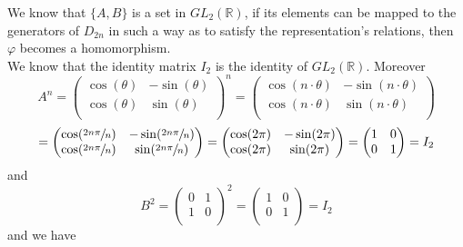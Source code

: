 \documentclass{article}
\newcommand{\R}{\mathbb{R}}
\begin{document}
\begin{enumerate}[label=\textbf{\alph*.}]
            We know that $\{A, B\}$ is a set in $GL_2(\R)$,
            if its elements can be mapped to the generators of $D_{2n}$
            in such a way as to satisfy the representation's relations,
            then $\varphi$ becomes a homomorphism. \\ 
            We know that the identity matrix $I_2$ is the identity of
            $GL_2(\R)$.
            Moreover
            \[ A^n = \begin{pmatrix}
                \cos(\theta) & -\sin(\theta) \\
                \cos(\theta) & \sin(\theta) \\
            \end{pmatrix}^n
            = \begin{pmatrix}
                \cos(n \cdot \theta) & -\sin(n \cdot \theta) \\
                \cos(n \cdot \theta) & \sin(n \cdot \theta) \\
            \end{pmatrix} \]
            \[ = \begin{pmatrix}
                \cos(\sfrac{2n \pi}{n}) & -\sin(\sfrac{2n \pi}{n}) \\
                \cos(\sfrac{2n \pi}{n}) & \sin(\sfrac{2n \pi}{n}) \\
            \end{pmatrix} 
             = \begin{pmatrix}
                \cos(2\pi) & -\sin(2\pi) \\
                \cos(2\pi) & \sin(2\pi) \\
            \end{pmatrix}
            = \begin{pmatrix}
                1 & 0 \\
                0 & 1 \\
            \end{pmatrix} = I_2 \]
            and
            \[ B^2 = \begin{pmatrix}
                0 & 1 \\
                1 & 0 \\
            \end{pmatrix}^2 
            =  \begin{pmatrix}
                1 & 0 \\
                0 & 1 \\
            \end{pmatrix} = I_2 \] 
            and we have

\end{enumerate}
\end{document}
